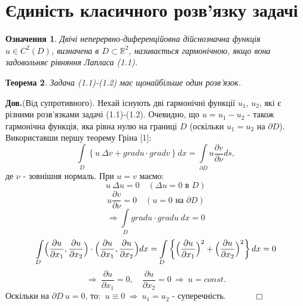 \documentclass[a4 paper,12pt,ukrainian]{report}
\newtheorem{theorem}{\textbf{Теорема}}[chapter]
\newtheorem{determination}[theorem]{\textbf{Означення}}
\begin{document}
\section{Єдиність класичного розв'язку задачі}
\begin{determination}\cite{Kress}
Двічі неперервно-диференційовна дійснозначна функція $u\in C^2(D)$, визначена в $D\subset\mathbb{R}^2$, називається гармонічною, якщо вона задовольняє рівняння Лапласа (1.1).
\end{determination}
\begin{theorem}\cite{Kress}
Задача (1.1)-(1.2) має щонайбільше один розв'язок.
\end{theorem}
\textbf{Дов.}(Від супротивного). Нехай існують дві гармонічні функції $u_1$, $u_2$, які є різними розв'язками задачі (1.1)-(1.2). Очевидно, що $u=u_1-u_2$ - також гармонічна функція, яка рівна нулю на границі $D$ (оскільки $u_1=u_2$ на $\partial D$).\\
\hspace*{\parindent}Використавши першу теорему Гріна [1]:
\begin{equation*}
\int\limits_{D}\left\{u \ \Delta v+gradu\cdot gradv\right\}dx=\int\limits_{\partial D}u\frac{\partial v}{\partial\nu}ds,
\end{equation*}
де $\nu$ - зовнішня нормаль. При $u=v$ маємо:
\begin{equation*}
u \ \Delta u=0 \quad (\Delta u=0\text{ в }D)
\end{equation*}
\begin{equation*}
u\frac{\partial v}{\partial\nu}=0 \quad (u=0\text{ на }\partial D)
\end{equation*}
\begin{equation*}
\Rightarrow\int\limits_{D}gradu\cdot gradu \ dx=0
\end{equation*}
\begin{equation*}
\int\limits_{D}\Bigl(\frac{\partial u}{\partial x_1},\frac{\partial u}{\partial x_2}\Bigr)\cdot\Bigl(\frac{\partial u}{\partial x_1},\frac{\partial u}{\partial x_2}\Bigr)dx=\int\limits_{D}\left\{\Bigl(\frac{\partial u}{\partial x_1}\Bigr)^2+\Bigl(\frac{\partial u}{\partial x_2}\Bigr)^2\right\}dx=0
\end{equation*}
\begin{equation*}
\Rightarrow \ \frac{\partial u}{\partial x_1}=0, \quad \frac{\partial u}{\partial x_2}=0 \ \Rightarrow \ u=const.
\end{equation*}
Оскільки на $\partial D \ u=0$, то: $ \ u\equiv 0 \ \Rightarrow \ u_1=u_2$ - суперечність. $\quad\quad\quad\Box$ 
\newpage
\end{document}
